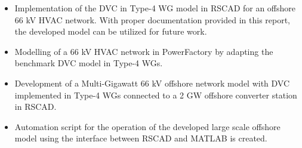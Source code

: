 \begin{itemize}
    \item Implementation of the \gls{DVC} in Type-4 \gls{WG} model in RSCAD for an offshore 66 kV \gls{HVAC} network. With proper documentation provided in this report, the developed model can be utilized for future work.
    
    \item Modelling of a 66 kV \gls{HVAC} network in PowerFactory by adapting the benchmark \gls{DVC} model in Type-4 \gls{WG}s.
    
    \item Development of a Multi-Gigawatt 66 kV offshore network model with \gls{DVC} implemented in Type-4 \gls{WG}s connected to a 2 GW offshore converter station in RSCAD. 
    
    \item Automation script for the operation of the developed large scale offshore model using the interface between RSCAD and MATLAB is created.
\end{itemize}

